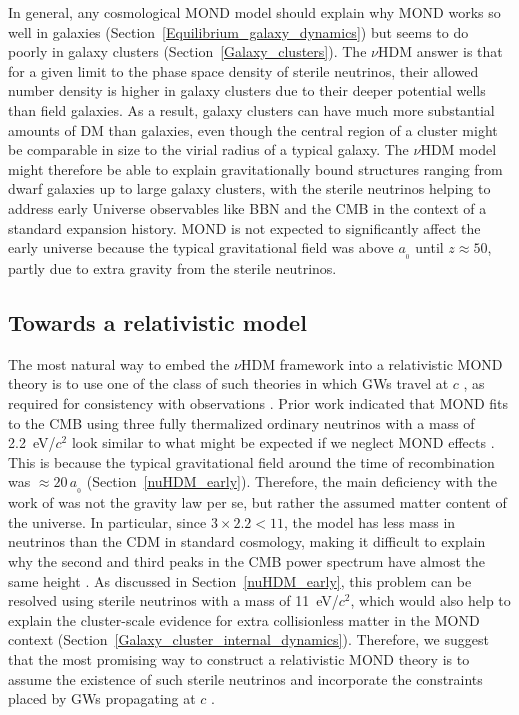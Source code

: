 \documentclass[fleqn,usenatbib,useAMS,onecolumn]{mnras} %
\begin{document}
In general, any cosmological MOND model should explain why MOND works so well in galaxies (Section~\ref{Equilibrium_galaxy_dynamics}) but seems to do poorly in galaxy clusters (Section~\ref{Galaxy_clusters}). The $\nu$HDM answer is that for a given limit to the phase space density of sterile neutrinos, their allowed number density is higher in galaxy clusters due to their deeper potential wells than field galaxies. As a result, galaxy clusters can have much more substantial amounts of DM than galaxies, even though the central region of a cluster might be comparable in size to the virial radius of a typical galaxy. The $\nu$HDM model might therefore be able to explain gravitationally bound structures ranging from dwarf galaxies up to large galaxy clusters, with the sterile neutrinos helping to address early Universe observables like BBN and the CMB in the context of a standard expansion history. MOND is not expected to significantly affect the early universe because the typical gravitational field was above $a_{_0}$ until $z \approx 50$, partly due to extra gravity from the sterile neutrinos.



\subsection{Towards a relativistic model}
\label{Relativistic_cosmological_model}

The most natural way to embed the $\nu$HDM framework into a relativistic MOND theory is to use one of the class of such theories in which GWs travel at $c$ \citep{Skordis_2019}, as required for consistency with observations \citep{LIGO_Virgo_2017}. Prior work indicated that MOND fits to the CMB using three fully thermalized ordinary neutrinos with a mass of 2.2~eV/$c^2$ \citep{Skordis_2006} look similar to what might be expected if we neglect MOND effects \citep{Angus_2009}. This is because the typical gravitational field around the time of recombination was $\approx 20 \, a_{_0}$ (Section~\ref{nuHDM_early}). Therefore, the main deficiency with the work of \citet{Skordis_2006} was not the gravity law per se, but rather the assumed matter content of the universe. In particular, since $3 \times 2.2 < 11$, the model has less mass in neutrinos than the CDM in standard cosmology, making it difficult to explain why the second and third peaks in the CMB power spectrum have almost the same height \citep{Planck_2020}. As discussed in Section~\ref{nuHDM_early}, this problem can be resolved using sterile neutrinos with a mass of 11~eV/$c^2$, which would also help to explain the cluster-scale evidence for extra collisionless matter in the MOND context (Section~\ref{Galaxy_cluster_internal_dynamics}). Therefore, we suggest that the most promising way to construct a relativistic MOND theory is to assume the existence of such sterile neutrinos and incorporate the constraints placed by GWs propagating at $c$ \citep{Skordis_2019}.
\end{document}
